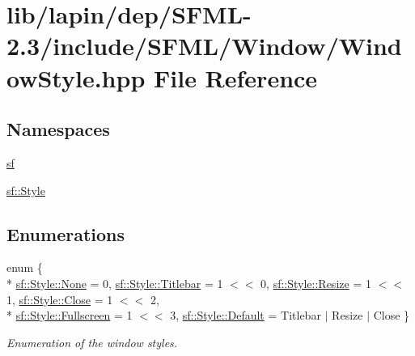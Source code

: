 \hypertarget{lapin_2dep_2_s_f_m_l-2_83_2include_2_s_f_m_l_2_window_2_window_style_8hpp}{\section{lib/lapin/dep/\-S\-F\-M\-L-\/2.3/include/\-S\-F\-M\-L/\-Window/\-Window\-Style.hpp File Reference}
\label{lapin_2dep_2_s_f_m_l-2_83_2include_2_s_f_m_l_2_window_2_window_style_8hpp}
}
\subsection*{Namespaces}
\begin{DoxyCompactItemize}
\item 
\hyperlink{namespacesf}{sf}
\item 
\hyperlink{namespacesf_1_1_style}{sf\-::\-Style}
\end{DoxyCompactItemize}
\subsection*{Enumerations}
\begin{DoxyCompactItemize}
\item 
enum \{ \\*
\hyperlink{group__window_gga363853f6419f9ca64dcd85eae2e5caa9ac2b155f5f7b49b49c7fb99655f8da86e}{sf\-::\-Style\-::\-None} = 0, 
\hyperlink{group__window_gga363853f6419f9ca64dcd85eae2e5caa9abf046c6fcae63075c651812c6774e389}{sf\-::\-Style\-::\-Titlebar} = 1 $<$$<$ 0, 
\hyperlink{group__window_gga363853f6419f9ca64dcd85eae2e5caa9aa7c6f765bd5c0cdd9f81b47871508f3e}{sf\-::\-Style\-::\-Resize} = 1 $<$$<$ 1, 
\hyperlink{group__window_gga363853f6419f9ca64dcd85eae2e5caa9a76bbd82b28e359cc0feec9e5ec123b40}{sf\-::\-Style\-::\-Close} = 1 $<$$<$ 2, 
\\*
\hyperlink{group__window_gga363853f6419f9ca64dcd85eae2e5caa9ac0b0bcb071d1ae40aefb7a1a7464f079}{sf\-::\-Style\-::\-Fullscreen} = 1 $<$$<$ 3, 
\hyperlink{group__window_gga363853f6419f9ca64dcd85eae2e5caa9aaf73ca9c9fa787f9da9c1d7527d42734}{sf\-::\-Style\-::\-Default} = Titlebar $\vert$ Resize $\vert$ Close
 \}
\begin{DoxyCompactList}\small\item\em Enumeration of the window styles. \end{DoxyCompactList}\end{DoxyCompactItemize}
